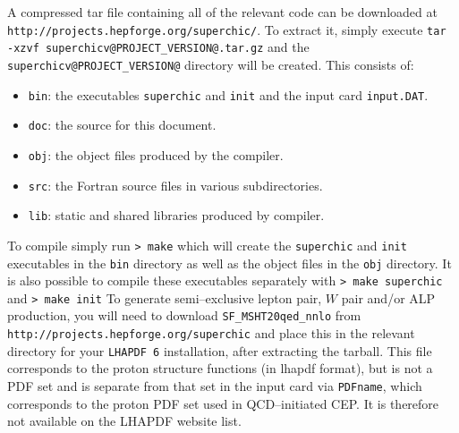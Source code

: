 \documentclass[12pt]{article}
\begin{document}
A compressed tar file containing all of the relevant code can be downloaded at \texttt{http://projects.hepforge.org/superchic/}. To extract it, simply execute \texttt{tar -xzvf superchicv@PROJECT_VERSION@.tar.gz} and the \texttt{superchicv@PROJECT_VERSION@} directory will be created. This consists of:
%
\begin{itemize}
\item \texttt{bin}: the executables \texttt{superchic} and \texttt{init} and the input card \texttt{input.DAT}.
\item \texttt{doc}: the source for this document.
\item \texttt{obj}: the object files produced by the compiler.
\item \texttt{src}: the Fortran source files in various subdirectories.
\item \texttt{lib}: static and shared libraries produced by compiler.
\end{itemize}
%
To compile simply run
\newline
\newline
\texttt{> make}
\newline
\newline
which will create the \texttt{superchic} and \texttt{init} executables in the \texttt{bin} directory as well as the object files in the \texttt{obj} directory. It is also possible to compile these executables separately with
\newline
\newline
\texttt{> make superchic}
\newline
\newline
and
\newline
\newline
\texttt{> make init}
\newline
\newline
To generate semi--exclusive lepton pair, $W$ pair and/or ALP production, you will need to download \texttt{SF\_MSHT20qed\_nnlo} from \texttt{http://projects.hepforge.org/superchic} and place this in the relevant directory for your \texttt{LHAPDF 6} installation, after extracting the tarball. This file corresponds to the proton structure functions (in lhapdf format), but is not a PDF set and is separate from that set in the input card via \texttt{PDFname}, which corresponds to the proton PDF set used in QCD--initiated CEP. It is therefore not available on the LHAPDF website list.
\end{document}

